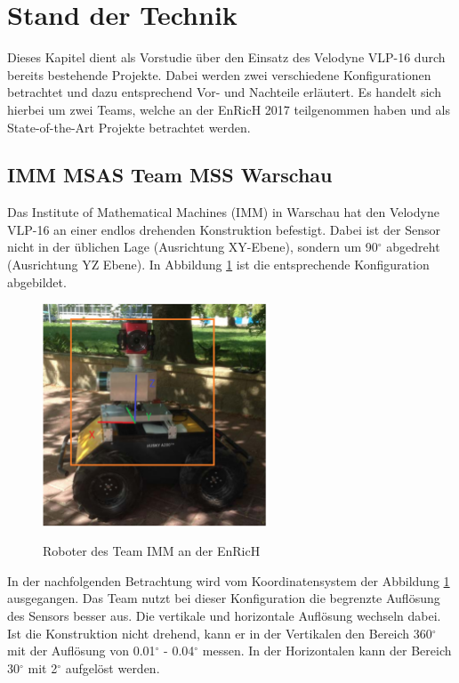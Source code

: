\section{Stand der Technik}
 \label{sec:Vorzeigeprojekte}
 Dieses Kapitel dient als Vorstudie über den Einsatz des Velodyne VLP-16 durch bereits bestehende Projekte. Dabei werden zwei verschiedene Konfigurationen betrachtet und dazu entsprechend Vor- und Nachteile erläutert. Es handelt sich hierbei um zwei Teams, welche an der \ac{EnRicH} 2017 teilgenommen haben und als State-of-the-Art Projekte betrachtet werden.
 
 \subsection{IMM MSAS Team MSS Warschau}
 \label{subsec:IMM}
Das Institute of Mathematical Machines (IMM) in Warschau hat den Velodyne VLP-16 an einer endlos drehenden Konstruktion befestigt. Dabei ist der Sensor nicht in der üblichen Lage (Ausrichtung XY-Ebene), sondern um 90$^\circ$ abgedreht (Ausrichtung YZ Ebene). In Abbildung \ref{fig:imm} ist die entsprechende Konfiguration abgebildet. 

   \begin{figure}[H]
	\centering
	\includegraphics[width=0.6\textwidth]
	{resources/IMM.PNG}
	\caption[Roboter des Team IMM EnRicH]{Roboter des Team IMM an der EnRicH} \protect\cite{IMM}
	\label{fig:imm}
\end{figure}

In der nachfolgenden Betrachtung wird vom Koordinatensystem der Abbildung \ref{fig:imm} ausgegangen.
Das Team nutzt bei dieser Konfiguration die begrenzte Auflösung des Sensors besser aus. Die vertikale und horizontale Auflösung wechseln dabei. Ist die Konstruktion nicht drehend, kann er in der Vertikalen den Bereich 360$^\circ$ mit der Auflösung von 0.01$^\circ$ - 0.04$^\circ$ messen. In der Horizontalen kann der Bereich 30$^\circ$ mit 2$^\circ$ aufgelöst werden. 

